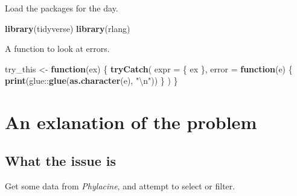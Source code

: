 \documentclass[]{book}
\newenvironment{Shaded}{}{}
\newcommand{\CharTok}[1]{\textcolor[rgb]{0.25,0.44,0.63}{#1}}
\newcommand{\CommentTok}[1]{\textcolor[rgb]{0.38,0.63,0.69}{\textit{#1}}}
\newcommand{\ControlFlowTok}[1]{\textcolor[rgb]{0.00,0.44,0.13}{\textbf{#1}}}
\newcommand{\DataTypeTok}[1]{\textcolor[rgb]{0.56,0.13,0.00}{#1}}
\newcommand{\DecValTok}[1]{\textcolor[rgb]{0.25,0.63,0.44}{#1}}
\newcommand{\KeywordTok}[1]{\textcolor[rgb]{0.00,0.44,0.13}{\textbf{#1}}}
\newcommand{\NormalTok}[1]{#1}
\newcommand{\OperatorTok}[1]{\textcolor[rgb]{0.40,0.40,0.40}{#1}}
\newcommand{\StringTok}[1]{\textcolor[rgb]{0.25,0.44,0.63}{#1}}
\begin{document}
Load the packages for the day.

\begin{Shaded}
\begin{Highlighting}[]
\KeywordTok{library}\NormalTok{(tidyverse)}
\KeywordTok{library}\NormalTok{(rlang)}
\end{Highlighting}
\end{Shaded}

A function to look at errors.

\begin{Shaded}
\begin{Highlighting}[]
\NormalTok{try_this <-}\StringTok{ }\ControlFlowTok{function}\NormalTok{(ex) \{}
  \KeywordTok{tryCatch}\NormalTok{(}
    \DataTypeTok{expr =}\NormalTok{ \{}
\NormalTok{      ex}
\NormalTok{    \},}
    \DataTypeTok{error =} \ControlFlowTok{function}\NormalTok{(e) \{}
      \KeywordTok{print}\NormalTok{(glue}\OperatorTok{::}\KeywordTok{glue}\NormalTok{(}\KeywordTok{as.character}\NormalTok{(e), }\StringTok{"}\CharTok{\textbackslash{}n}\StringTok{"}\NormalTok{))}
\NormalTok{    \}}
\NormalTok{  )}
\NormalTok{\}}
\end{Highlighting}
\end{Shaded}

\hypertarget{an-exlanation-of-the-problem}{%
\section{An exlanation of the problem}\label{an-exlanation-of-the-problem}}

\hypertarget{what-the-issue-is}{%
\subsection{What the issue is}\label{what-the-issue-is}}

Get some data from \emph{Phylacine}, and attempt to select or filter.

\begin{Shaded}
\end{Shaded}
\end{document}
